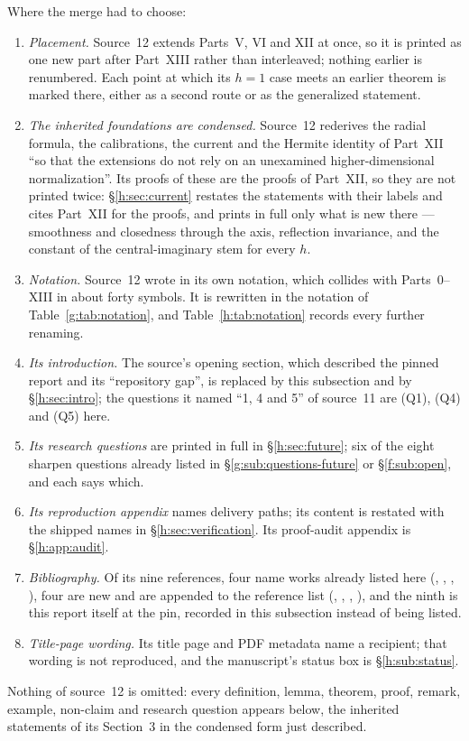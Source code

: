 \documentclass[11pt,a4paper]{article}
\numberwithin{equation}{section}
\theoremstyle{definition}
\theoremstyle{remark}
\theoremstyle{plain}
\begin{document}
Where the merge had to choose:
\begin{enumerate}[label=\textup{(\roman*)}]
\item \emph{Placement.} Source~12 extends Parts~V, VI and XII at once, so it
is printed as one new part after Part~XIII rather than interleaved; nothing
earlier is renumbered. Each point at which its $h=1$ case meets an earlier
theorem is marked there, either as a second route or as the generalized
statement.
\item \emph{The inherited foundations are condensed.} Source~12 rederives
the radial formula, the calibrations, the current and the Hermite identity of
Part~XII ``so that the extensions do not rely on an unexamined
higher-dimensional normalization''. Its proofs of these are the proofs of
Part~XII, so they are not printed twice: \S\ref{h:sec:current} restates the
statements with their labels and cites Part~XII for the proofs, and prints in
full only what is new there --- smoothness and closedness through the axis,
reflection invariance, and the constant of the central-imaginary stem for
every $h$.
\item \emph{Notation.} Source~12 wrote in its own notation, which collides
with Parts~0--XIII in about forty symbols. It is rewritten in the notation of
Table~\ref{g:tab:notation}, and Table~\ref{h:tab:notation} records every
further renaming.
\item \emph{Its introduction.} The source's opening section, which described
the pinned report and its ``repository gap'', is replaced by this subsection
and by \S\ref{h:sec:intro}; the questions it named ``1, 4 and 5'' of source~11
are (Q1), (Q4) and (Q5) here.
\item \emph{Its research questions} are printed in full in
\S\ref{h:sec:future}; six of the eight sharpen questions already listed in
\S\ref{g:sub:questions-future} or \S\ref{f:sub:open}, and each says which.
\item \emph{Its reproduction appendix} names delivery paths; its content is
restated with the shipped names in \S\ref{h:sec:verification}. Its proof-audit
appendix is \S\ref{h:app:audit}.
\item \emph{Bibliography.} Of its nine references, four name works already
listed here (\cite{CSS}, \cite{CPSS}, \cite{Perottib}, \cite{DMP}), four are
new and are appended to the reference list (\cite{Forster}, \cite{PV},
\cite{Vogt}, \cite{DV}), and the ninth is this report itself at the pin,
recorded in this subsection instead of being listed.
\item \emph{Title-page wording.} Its title page and PDF metadata name a
recipient; that wording is not reproduced, and the manuscript's status box is
\S\ref{h:sub:status}.
\end{enumerate}
Nothing of source~12 is omitted: every definition, lemma, theorem, proof,
remark, example, non-claim and research question appears below, the
inherited statements of its Section~3 in the condensed form just described.
\end{document}
